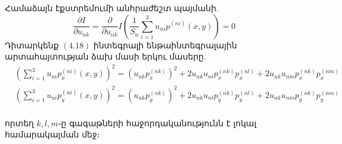 \documentclass[fleqn, bachelor,subf,12pt,notitlepage]{article}
\begin{document}
Համաձայն էքստրեմումի անհրաժեշտ պայմանի.
\begin{equation}
\dfrac{\partial I}{ \partial u_{nk}} = \dfrac{\partial}{\partial u_{nk}} I \left(\dfrac{1}{S_{n}}\sum_{i=1}^{3}u_{ni}p^{(ni)}(x,y)\right) = 0
\end{equation}
Դիտարկենք $\left(4.18\right)$ ինտեգրալի ենթաինտեգրալային արտահայտության ձախ մասի երկու մասերը.
\begin{equation}
\begin{aligned}
&\left(\sum_{i=1}^{3}u_{ni}p^{(ni)}_{x}(x,y)\right)^2=\left(u_{nk}p_{x}^{(nk)}\right)^{2}+2u_{nk}u_{nl}p_{x}^{(nk)}p_{x}^{(nl)}+2u_{nk}u_{nm}p_{x}^{(nk)}p_{x}^{(nm)} \\
&\left(\sum_{i=1}^{3}u_{ni}p^{(ni)}_{y}(x,y)\right)^2=\left(u_{nk}p_{y}^{(nk)}\right)^{2}+2u_{nk}u_{nl}p_{y}^{(nk)}p_{y}^{(nl)}+2u_{nk}u_{nm}p_{y}^{(nk)}p_{y}^{(nm)} \\
\end{aligned}
\end{equation}

\noindent որտեղ $k, l, m$֊ը գագաթների հաջորդականությունն է լոկալ համարակալման մեջ։
\end{document}
